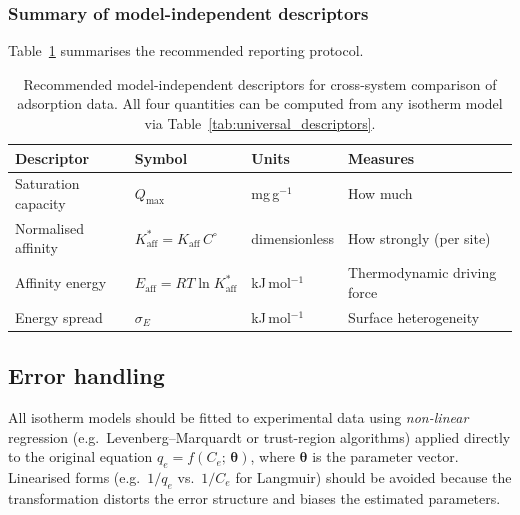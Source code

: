 \documentclass[12pt]{article}
\begin{document}
	\subsubsection{Summary of model-independent descriptors}

	Table~\ref{tab:comparison_protocol} summarises the recommended
	reporting protocol.

	\begin{table}[htbp]
		\centering
		\small
		\caption{Recommended model-independent descriptors for
			cross-system comparison of adsorption data.  All four
			quantities can be computed from any isotherm model via
			Table~\ref{tab:universal_descriptors}.}
		\label{tab:comparison_protocol}
		\renewcommand{\arraystretch}{1.4}
		\begin{tabular}{llll}
			\hline
			\textbf{Descriptor}
			& \textbf{Symbol}
			& \textbf{Units}
			& \textbf{Measures}
			\\
			\hline
			Saturation capacity
			& $Q_{\max}$
			& mg\,g$^{-1}$
			& How much
			\\
			Normalised affinity
			& $K_{\mathrm{aff}}^{\ast}
			= K_{\mathrm{aff}}\,C^\circ$
			& dimensionless
			& How strongly (per site)
			\\
			Affinity energy
			& $E_{\mathrm{aff}}
			= RT\ln K_{\mathrm{aff}}^{\ast}$
			& kJ\,mol$^{-1}$
			& Thermodynamic driving force
			\\
			Energy spread
			& $\sigma_E$
			& kJ\,mol$^{-1}$
			& Surface heterogeneity
			\\
			\hline
		\end{tabular}
	\end{table}

	\noindent{}

	\subsection{Error handling}

	All isotherm models should be fitted to experimental data using
	\emph{non-linear} regression (e.g.\ Levenberg--Marquardt or
	trust-region algorithms) applied directly to the original equation
	$q_e = f(C_e;\,\boldsymbol{\theta})$, where
	$\boldsymbol{\theta}$ is the parameter vector.
	Linearised forms (e.g.\ $1/q_e$ vs.\ $1/C_e$ for Langmuir) should
	be avoided because the transformation distorts the error structure
	and biases the estimated parameters.
\end{document}
